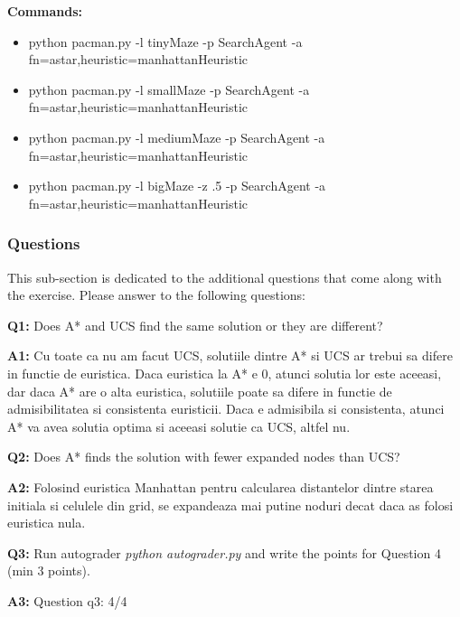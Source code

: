 \textbf{Commands:}
\begin{itemize}
    \setlength\itemsep{0em}
\item python pacman.py -l tinyMaze -p SearchAgent -a fn=astar,heuristic=manhattanHeuristic
\item python pacman.py -l smallMaze -p SearchAgent -a fn=astar,heuristic=manhattanHeuristic
\item python pacman.py -l mediumMaze -p SearchAgent -a fn=astar,heuristic=manhattanHeuristic
    \item python pacman.py -l bigMaze -z .5 -p SearchAgent -a fn=astar,heuristic=manhattanHeuristic %
        
\end{itemize}

\subsubsection{Questions}
This sub-section is dedicated to the additional questions that come along with the exercise. Please answer to the following questions:\newline


\textbf{Q1:} Does A* and UCS find the same solution or they are different?


\textbf{A1:} Cu toate ca nu am facut UCS, solutiile dintre A* si UCS ar trebui sa difere in functie de euristica. Daca euristica la A* e 0, atunci solutia lor este aceeasi, dar daca A* are o alta euristica, solutiile poate sa difere in functie de admisibilitatea si consistenta euristicii. Daca e admisibila si consistenta, atunci A* va avea solutia optima si aceeasi solutie ca UCS, altfel nu.%


\textbf{Q2:} Does A* finds the solution with fewer expanded nodes than UCS?


\textbf{A2:} Folosind euristica Manhattan pentru calcularea distantelor dintre starea initiala si celulele din grid, se expandeaza mai putine noduri decat daca as folosi euristica nula. %


\textbf{Q3:} Run autograder \textit{python autograder.py} and write the points for Question 4 (min 3 points).


\textbf{A3:} Question q3: 4/4 %



